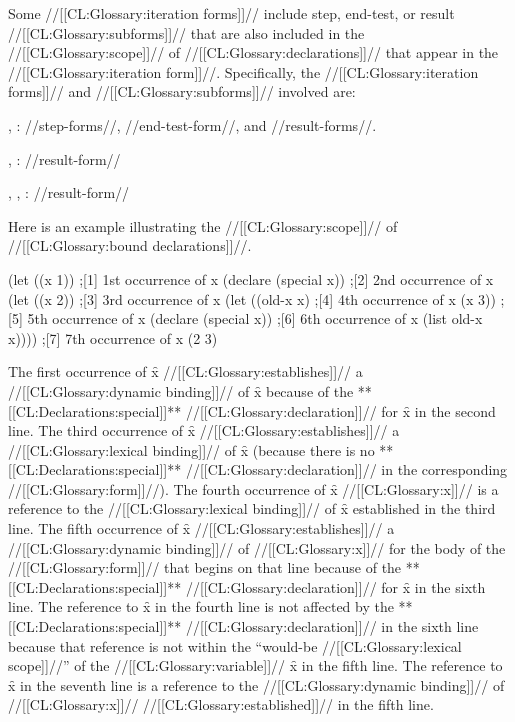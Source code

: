 Some //[[CL:Glossary:iteration forms]]// include step, end-test, or result  //[[CL:Glossary:subforms]]// that are also included in the //[[CL:Glossary:scope]]// of //[[CL:Glossary:declarations]]// that appear in the //[[CL:Glossary:iteration form]]//. Specifically, the //[[CL:Glossary:iteration forms]]// and //[[CL:Glossary:subforms]]// involved are:

\beginlist \item{\bull} , :  
  //step-forms//, //end-test-form//, and //result-forms//. \item{\bull} , :
  //result-form// \item{\bull} , , :
  //result-form// \endlist


Here is an example illustrating the //[[CL:Glossary:scope]]// of //[[CL:Glossary:bound declarations]]//.

\code
 (let ((x 1))                ;[1] 1st occurrence of x
   (declare (special x))     ;[2] 2nd occurrence of x
   (let ((x 2))              ;[3] 3rd occurrence of x
     (let ((old-x x)         ;[4] 4th occurrence of x
           (x 3))            ;[5] 5th occurrence of x
       (declare (special x)) ;[6] 6th occurrence of x
       (list old-x x))))     ;[7] 7th occurrence of x \EV (2 3) \endcode

The first occurrence of \f{x} //[[CL:Glossary:establishes]]// a //[[CL:Glossary:dynamic binding]]// of \f{x} because of the **[[CL:Declarations:special]]** //[[CL:Glossary:declaration]]// for \f{x} in the second line.  The third occurrence of \f{x} //[[CL:Glossary:establishes]]// a //[[CL:Glossary:lexical binding]]// of \f{x} (because there is no **[[CL:Declarations:special]]** //[[CL:Glossary:declaration]]// in the corresponding  //[[CL:Glossary:form]]//). The fourth occurrence of \f{x} //[[CL:Glossary:x]]// is a reference to the //[[CL:Glossary:lexical binding]]// of \f{x} established in the third line. The fifth occurrence of \f{x} //[[CL:Glossary:establishes]]// a //[[CL:Glossary:dynamic binding]]// of //[[CL:Glossary:x]]// for the body of the  //[[CL:Glossary:form]]// that begins on that line because of the **[[CL:Declarations:special]]** //[[CL:Glossary:declaration]]// for \f{x} in the sixth line. The reference to \f{x} in the fourth line is not affected by the **[[CL:Declarations:special]]** //[[CL:Glossary:declaration]]// in the sixth line  because that reference is not within the ``would-be //[[CL:Glossary:lexical scope]]//'' of the //[[CL:Glossary:variable]]// \f{x} in the fifth line.  The reference to \f{x} in the seventh line is a reference to the //[[CL:Glossary:dynamic binding]]// of //[[CL:Glossary:x]]// //[[CL:Glossary:established]]// in the fifth line.

